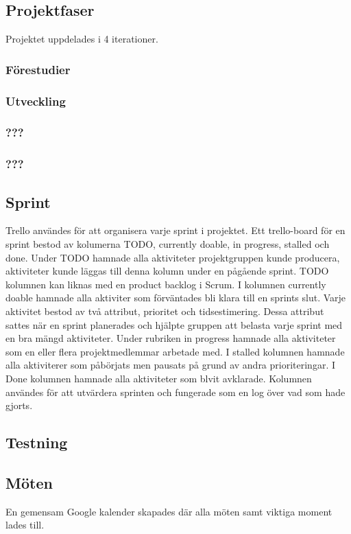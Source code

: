 \subsection{Projektfaser}
Projektet uppdelades i 4 iterationer.

\subsubsection*{Förestudier}
\subsubsection*{Utveckling}
\subsubsection*{???}
\subsubsection*{???}

\subsection{Sprint}
Trello användes för att organisera varje sprint i projektet. Ett trello-board för en sprint bestod av kolumerna TODO, currently doable, in progress, stalled och done. Under TODO hamnade alla aktiviteter projektgruppen kunde producera, aktiviteter kunde läggas till denna kolumn under en pågående sprint. TODO kolumnen kan liknas med en product backlog i Scrum. I kolumnen currently doable hamnade alla aktiviter som förväntades bli klara till en sprints slut. Varje aktivitet bestod av två attribut, prioritet och tidsestimering. Dessa attribut sattes när en sprint planerades och hjälpte gruppen att belasta varje sprint med en bra mängd aktiviteter. Under rubriken in progress hamnade alla aktiviteter som en eller flera projektmedlemmar arbetade med. I stalled kolumnen hamnade alla aktiviterer som påbörjats men pausats på grund av andra prioriteringar. I Done kolumnen hamnade alla aktiviteter som blvit avklarade. Kolumnen användes för att utvärdera sprinten och fungerade som en log över vad som hade gjorts.

\subsection{Testning}


\subsection{Möten}
En gemensam Google kalender skapades där alla möten samt viktiga moment lades till.

